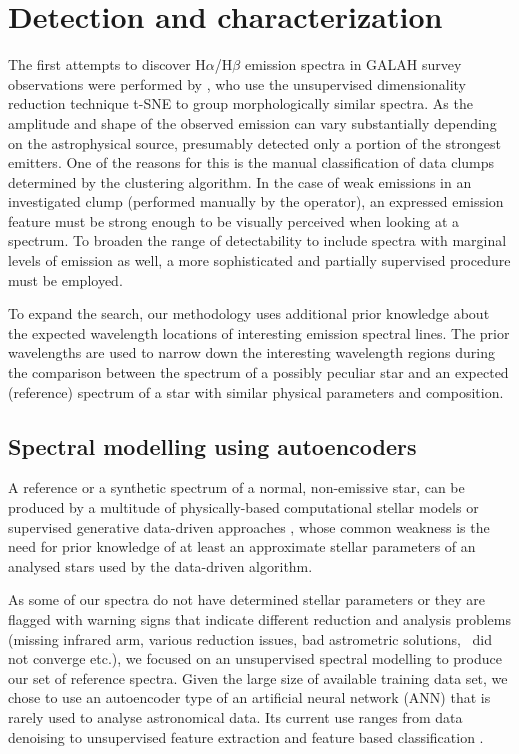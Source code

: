 \section{Detection and characterization}
\label{sec:det_chart}
The first attempts to discover H$\alpha$/H$\beta$ emission spectra in GALAH survey observations were performed by \citet{2017ApJS..228...24T}, who use the unsupervised dimensionality reduction technique t-SNE \cite{2013arXiv1301.3342V} to group morphologically similar spectra. As the amplitude and shape of the observed emission can vary substantially depending on the astrophysical source, \citet{2017ApJS..228...24T} presumably detected only a portion of the strongest emitters. One of the reasons for this is the manual classification of data clumps determined by the clustering algorithm. In the case of weak emissions in an investigated clump (performed manually by the operator), an expressed emission feature must be strong enough to be visually perceived when looking at a spectrum. To broaden the range of detectability to include spectra with marginal levels of emission as well, a more sophisticated and partially supervised procedure must be employed.

To expand the search, our methodology uses additional prior knowledge about the expected wavelength locations of interesting emission spectral lines. The prior wavelengths are used to narrow down the interesting wavelength regions during the comparison between the spectrum of a possibly peculiar star and an expected (reference) spectrum of a star with similar physical parameters and composition.

\subsection{Spectral modelling using autoencoders}
\label{sec:ref_modeling}
A reference or a synthetic spectrum of a normal, non-emissive star, can be produced by a multitude of physically-based computational stellar models \cite{1993sssp.book.....K, 2005A&A...442.1127M, 2012ASInC...6...53D} or supervised generative data-driven approaches \cite{2015AAS...22530207N, 2019ApJ...879...69T}, whose common weakness is the need for prior knowledge of at least an approximate stellar parameters of an analysed stars used by the data-driven algorithm.

As some of our spectra do not have determined stellar parameters or they are flagged with warning signs that indicate different reduction and analysis problems (missing infrared arm, various reduction issues, bad astrometric solutions, \SME\ did not converge etc.), we focused on an unsupervised spectral modelling to produce our set of reference spectra. Given the large size of available training data set, we chose to use an autoencoder type of an artificial neural network (ANN) that is rarely used to analyse astronomical data. Its current use ranges from data denoising \cite{2017ChA&A..41..282Q, 2019arXiv190303105S, 2019MNRAS.485.2628L} to unsupervised feature extraction and feature based classification \cite{2015MNRAS.452..158Y, 2017RAA....17...36L, 2017ChA&A..41..318P, 2018arXiv180901434K, 2019arXiv191104320C, 2019ApJS..240...34M, 2019PASP..131j8011R}.

